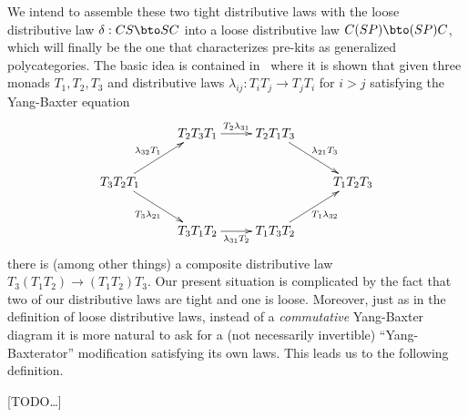 \documentclass{amsart}
\newcommand{\C}{\cC}
\renewcommand{\Chat}{\ensuremath{\widehat{\C}}\xspace}
\newcommand{\E}{\cE}
\newcommand{\dl}{\delta}
\newcommand{\one}{\done}
\begin{document}
We intend to assemble these two tight distributive laws with the loose distributive law $\dl:C S \bto S C$ into a loose distributive law $C(SP) \bto (SP)C$, which will finally be the one that characterizes pre-kits as generalized polycategories.
The basic idea is contained in~\cite{cheng:iterated-dls} where it is shown that given three monads $T_1,T_2,T_3$ and distributive laws $\lambda_{ij}:T_i T_j \to T_j T_i$ for $i>j$ satisfying the Yang-Baxter equation
\[ \xymatrix{
& T_2 T_3 T_1 \ar[r]^{T_2 \lambda_{3 1}} &
T_2 T_1 T_3 \ar[dr]^{\lambda_{2 1} T_3} \\
T_3 T_2 T_1 \ar[ur]^{\lambda_{3 2} T_1} \ar[dr]_{T_3 \lambda_{2 1}} &&&
T_1 T_2 T_3 \\
& T_3 T_1 T_2 \ar[r]_{\lambda_{3 1} T_2} &
T_1 T_3 T_2 \ar[ur]_{T_1 \lambda_{3 2}}
}\]
there is (among other things) a composite distributive law $T_3(T_1 T_2) \to (T_1 T_2) T_3$.
Our present situation is complicated by the fact that two of our distributive laws are tight and one is loose.
Moreover, just as in the definition of loose distributive laws, instead of a \emph{commutative} Yang-Baxter diagram it is more natural to ask for a (not necessarily invertible) ``Yang-Baxterator'' modification satisfying its own laws.
This leads us to the following definition.

\begin{defn}
  
\end{defn}

[TODO\dots]


\end{document}
